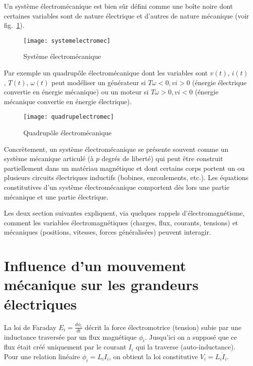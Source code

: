 Un système électromécanique est bien sûr défini comme une boîte noire dont certaines variables sont de nature électrique et d'autres de nature mécanique (voir fig.~\ref{fig:systemelectromec}).


\begin{figure}[t]
\begin{center}
\texttt{[image: systemelectromec]}
\caption{Système électromécanique}
\label{fig:systemelectromec}
\end{center}
\end{figure}

Par exemple un quadrupôle électromécanique dont les variables sont $v(t)$, $i(t)$, $T(t)$,  $\omega(t)$ peut modéliser un générateur si $T\omega<0, vi>0$ (énergie électrique convertie en énergie mécanique) ou un moteur si $T\omega>0, vi<0$ (énergie mécanique convertie en énergie électrique).


\begin{figure}[t]
\begin{center}
\texttt{[image: quadrupelectromec]}
\caption{Quadrupôle électromécanique}
\label{fig:quadrupelectromec}
\end{center}
\end{figure}


Concrètement, un système électromécanique se présente souvent comme un système
mécanique articulé (à $p$ degrés de liberté) qui peut être
construit partiellement dans un matériau magnétique et dont
certains corps portent un ou plusieurs circuits électriques inductifs (bobines,
enroulements, etc.). Les équations constitutives d'un système
électromécanique comportent dès lors une partie mécanique et
une partie électrique.

Les deux section suivantes expliquent, via quelques rappels d'électromagnétisme, comment les variables électromagnétiques (charges, flux, courants, tensions) et mécaniques (positions, vitesses, forces généralisées) peuvent interagir.

\section{Influence d'un mouvement mécanique sur les grandeurs électriques} 

La loi de Faraday $E_i=\frac{d\phi_i}{dt}$ décrit la force électromotrice (tension) subie par une inductance traversée par un flux magnétique $\phi_i$. Jusqu'ici on a supposé que ce flux était créé uniquement par le courant $I_i$ qui la traverse (auto-inductance). Pour une relation linéaire $\phi_i=L_iI_i$, on obtient la loi constitutive $V_i=L_i \dot{I}_i$.

